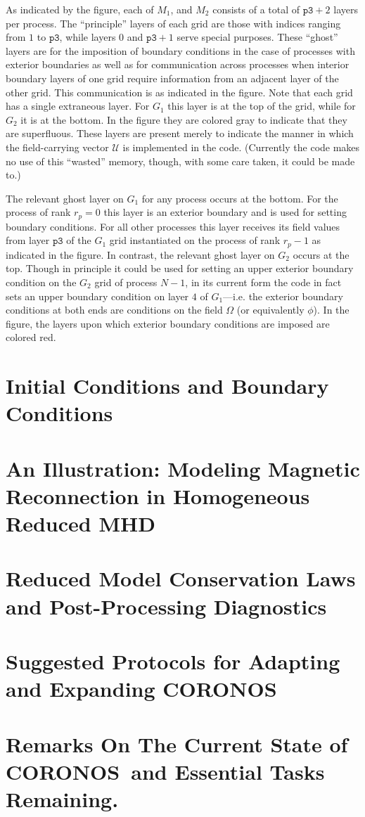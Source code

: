 \documentclass[12pt]{memoir}
\newcommand{\coronos}{\textsf{CORONOS}}
\newcommand{\ufield}{\mathscr{U}}
\begin{document}
%
As indicated by the figure, each of $M_1$, and $M_2$ consists of a total
of $\mathtt{p3}+2$ layers per process.  The ``principle'' layers of
each grid are those with indices ranging from $1$ to $\mathtt{p3}$,
while layers $0$ and $\mathtt{p3}+1$ serve special purposes. These ``ghost''
layers are for the imposition of boundary conditions in the case of
processes with exterior boundaries as well as for communication across
processes when interior boundary layers of one grid require information
from an adjacent layer of the other grid. This communication is as
indicated in the figure. Note that each grid has a single extraneous layer. 
For $G_1$ this layer is at the top of the grid, while for $G_2$ it is at 
the bottom. In the figure they are colored gray to indicate that they
are superfluous.  These layers are present merely to indicate the
manner in which the field-carrying vector $\ufield$ is implemented in
the code. (Currently the code makes no use of this ``wasted'' memory,
though, with some care taken, it could be made to.)
%
\par
%
The relevant ghost layer on $G_1$ for any process occurs at the
bottom. For the process of rank $r_p=0$ this layer is an exterior
boundary and is used for setting boundary conditions. For all other
processes this layer receives its field values from layer $\mathtt{p3}$
of the $G_1$ grid instantiated on the process of rank $r_p-1$ as
indicated in the figure. In contrast, the relevant ghost layer
on $G_2$ occurs at the top. Though in principle it could be used
for setting an upper exterior boundary condition on the $G_2$
grid of process $N-1$, in its current form the code in fact
sets an upper boundary condition on layer $4$ of $G_1$---i.e.
the exterior boundary conditions at both ends are conditions on the 
field $\Omega$ (or equivalently $\phi$). In the figure, the layers
upon which exterior boundary conditions are imposed are colored red.
%
\section{Initial Conditions and Boundary Conditions}
%
\section{An Illustration: Modeling Magnetic Reconnection in Homogeneous Reduced MHD}
%
\section{Reduced Model Conservation Laws and Post-Processing Diagnostics}
%
\section{Suggested Protocols for Adapting and Expanding \coronos}
%
\section{Remarks On The Current State of \coronos\ and Essential Tasks Remaining.}
%

{}
%
\end{document}
